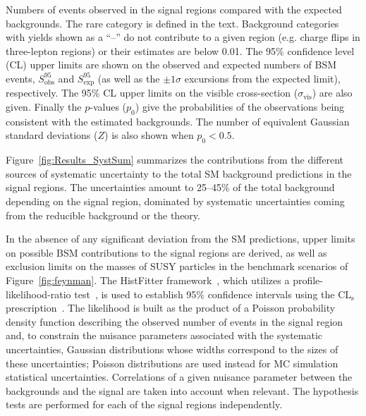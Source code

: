 \begin{table}
\begin{center}
\vspace*{1cm}


\vspace*{1cm}

\vspace*{-0.01\textheight}\caption{Numbers of events observed in the signal regions compared with the expected backgrounds. 
The rare category is defined in the text. Background categories with yields shown as a ``--'' 
do not contribute to a given region (e.g. charge flips in three-lepton regions) or their estimates are below 0.01. 
The 95\% confidence level (CL) upper limits are shown on the observed and expected numbers of BSM events, $S_{\textrm{obs}}^{95}$ and $S_{\textrm{exp}}^{95}$ 
(as well as the $\pm 1\sigma$ excursions from the expected limit), respectively. The 95\% CL upper limits on the visible cross-section 
($\sigma_{\textrm{vis}}$) are also given. Finally the $p$-values ($p_{0}$) give the probabilities of the observations being consistent 
with the estimated backgrounds. The number of equivalent Gaussian standard deviations ($Z$) is also shown when $p_{0}<0.5$.}
\label{tab:SR_yields}
\end{center}
\end{table}

Figure~\ref{fig:Results_SystSum} summarizes the contributions from the different sources of systematic uncertainty 
to the total SM background predictions in the signal regions. The uncertainties amount to 25--45\% of the 
total background depending on the signal region, dominated by systematic uncertainties coming from the reducible background or the theory. 

In the absence of any significant deviation from the SM predictions, upper limits on possible BSM contributions to the signal regions are derived, 
as well as exclusion limits on the masses of SUSY particles in the benchmark scenarios of Figure~\ref{fig:feynman}. 
The HistFitter framework~\cite{Baak:2014wma}, which utilizes a profile-likelihood-ratio test~\cite{Cowan:2010js}, 
is used to establish 95\% confidence intervals using the CL$_\mathrm{s}$ prescription~\cite{Read:2002hq}. 
The likelihood is built as the product of a Poisson probability density function describing the observed number of events in the signal region 
and, to constrain the nuisance parameters associated with the systematic uncertainties, 
Gaussian distributions whose widths correspond to the sizes of these uncertainties; 
Poisson distributions are used instead for MC simulation statistical uncertainties.
Correlations of a given nuisance parameter between the backgrounds and the signal are taken into account when relevant. 
The hypothesis tests are performed for each of the signal regions independently. 

